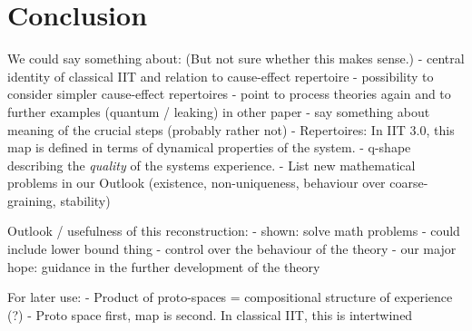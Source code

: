 \section{Conclusion}

We could say something about: (But not sure whether this makes sense.)
- central identity of classical IIT and relation to cause-effect repertoire
- possibility to consider simpler cause-effect repertoires
- point to process theories again and to further examples (quantum / leaking) in other paper
- say something about meaning of the crucial steps (probably rather not)
- Repertoires: In IIT 3.0, this map is defined in terms of dynamical properties of the system.
- q-shape describing the \emph{quality} of the systems experience.		
- List new mathematical problems in our Outlook (existence, non-uniqueness, behaviour over coarse-graining, stability)

Outlook / usefulness of this reconstruction:
- shown: solve math problems
- could include lower bound thing
- control over the behaviour of the theory
- our major hope: guidance in the further development of the theory


For later use:
- Product of proto-spaces = compositional structure of experience (?)
- Proto space first, map is second.
In classical IIT, this is intertwined